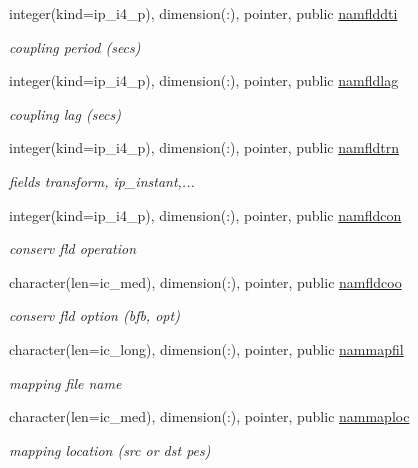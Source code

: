 \begin{DoxyCompactItemize}
integer(kind=ip\+\_\+i4\+\_\+p), dimension(\+:), pointer, public \hyperlink{namespacemod__oasis__namcouple_a9080617143dacb027f74c4c5158b5e58}{namflddti}
\begin{DoxyCompactList}\small\item\em coupling period (secs) \end{DoxyCompactList}\item 
integer(kind=ip\+\_\+i4\+\_\+p), dimension(\+:), pointer, public \hyperlink{namespacemod__oasis__namcouple_a6a4406ca14f91ef6514a18eb154e648f}{namfldlag}
\begin{DoxyCompactList}\small\item\em coupling lag (secs) \end{DoxyCompactList}\item 
integer(kind=ip\+\_\+i4\+\_\+p), dimension(\+:), pointer, public \hyperlink{namespacemod__oasis__namcouple_a5f81bc00e6dc045770edd4093f68278c}{namfldtrn}
\begin{DoxyCompactList}\small\item\em fields transform, ip\+\_\+instant,... \end{DoxyCompactList}\item 
integer(kind=ip\+\_\+i4\+\_\+p), dimension(\+:), pointer, public \hyperlink{namespacemod__oasis__namcouple_a96aa6a31ef021468f807819a84b327c3}{namfldcon}
\begin{DoxyCompactList}\small\item\em conserv fld operation \end{DoxyCompactList}\item 
character(len=ic\+\_\+med), dimension(\+:), pointer, public \hyperlink{namespacemod__oasis__namcouple_a119b86702766d5392cb44856448bcd3e}{namfldcoo}
\begin{DoxyCompactList}\small\item\em conserv fld option (bfb, opt) \end{DoxyCompactList}\item 
character(len=ic\+\_\+long), dimension(\+:), pointer, public \hyperlink{namespacemod__oasis__namcouple_a9fc6ac674a8cfa68d9d15ad13213e21d}{nammapfil}
\begin{DoxyCompactList}\small\item\em mapping file name \end{DoxyCompactList}\item 
character(len=ic\+\_\+med), dimension(\+:), pointer, public \hyperlink{namespacemod__oasis__namcouple_a7316d7d322da7cf10f315e38c145ebbb}{nammaploc}
\begin{DoxyCompactList}\small\item\em mapping location (src or dst pes) \end{DoxyCompactList}\item 

\end{DoxyCompactItemize}
